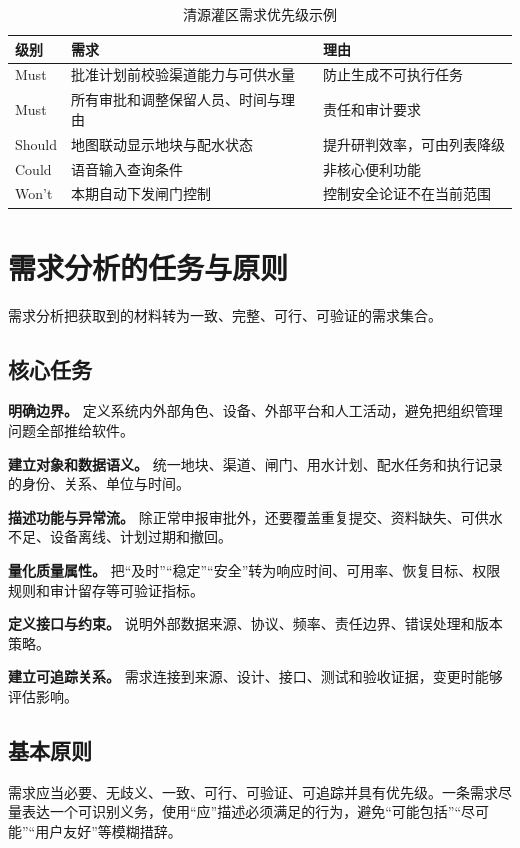 \begin{table}[htbp]
\centering
\caption{清源灌区需求优先级示例}
\label{tab:moscow-example}
\begin{tabular}{p{2.0cm}p{6.6cm}p{4.0cm}}
\toprule
级别 & 需求 & 理由 \\
\midrule
Must & 批准计划前校验渠道能力与可供水量 & 防止生成不可执行任务 \\
Must & 所有审批和调整保留人员、时间与理由 & 责任和审计要求 \\
Should & 地图联动显示地块与配水状态 & 提升研判效率，可由列表降级 \\
Could & 语音输入查询条件 & 非核心便利功能 \\
Won't & 本期自动下发闸门控制 & 控制安全论证不在当前范围 \\
\bottomrule
\end{tabular}
\end{table}

\section{需求分析的任务与原则}

需求分析把获取到的材料转为一致、完整、可行、可验证的需求集合。

\subsection{核心任务}

\textbf{明确边界。} 定义系统内外部角色、设备、外部平台和人工活动，避免把组织管理问题全部推给软件。

\textbf{建立对象和数据语义。} 统一地块、渠道、闸门、用水计划、配水任务和执行记录的身份、关系、单位与时间。

\textbf{描述功能与异常流。} 除正常申报审批外，还要覆盖重复提交、资料缺失、可供水不足、设备离线、计划过期和撤回。

\textbf{量化质量属性。} 把“及时”“稳定”“安全”转为响应时间、可用率、恢复目标、权限规则和审计留存等可验证指标。

\textbf{定义接口与约束。} 说明外部数据来源、协议、频率、责任边界、错误处理和版本策略。

\textbf{建立可追踪关系。} 需求连接到来源、设计、接口、测试和验收证据，变更时能够评估影响。

\subsection{基本原则}

需求应当必要、无歧义、一致、可行、可验证、可追踪并具有优先级\cite{wiegers2013,robertson2012}。一条需求尽量表达一个可识别义务，使用“应”描述必须满足的行为，避免“可能包括”“尽可能”“用户友好”等模糊措辞。

